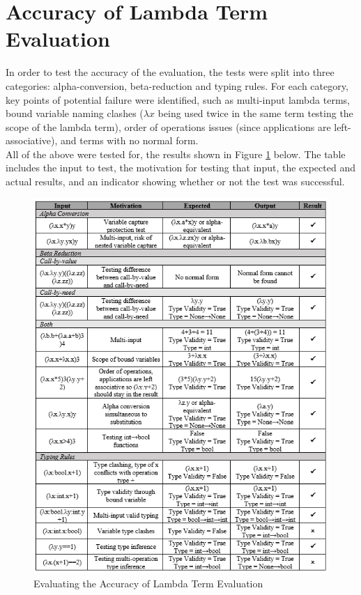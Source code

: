 \documentclass[a4paper,11pt]{report}
\begin{document}
\section{Accuracy of Lambda Term Evaluation}
\label{Accuracy of Lambda Term Evaluation}
In order to test the accuracy of the evaluation, the tests were split into three categories: alpha-conversion, beta-reduction and typing rules. For each category, key points of potential failure were identified, such as multi-input lambda terms, bound variable naming clashes ($\lambda x$ being used twice in the same term testing the scope of the lambda term), order of operations issues (since applications are left-associative), and terms with no normal form.\\

All of the above were tested for, the results shown in Figure \ref{testing_log} below. The table includes the input to test, the motivation for testing that input, the expected and actual results, and an indicator showing whether or not the test was successful.\\

\begin{figure}[p]
	\includegraphics[scale=1.3]{images/Testing_Log}
	\centering
	\caption{Evaluating the Accuracy of Lambda Term Evaluation}
	\label{testing_log}
\end{figure}
\end{document}
